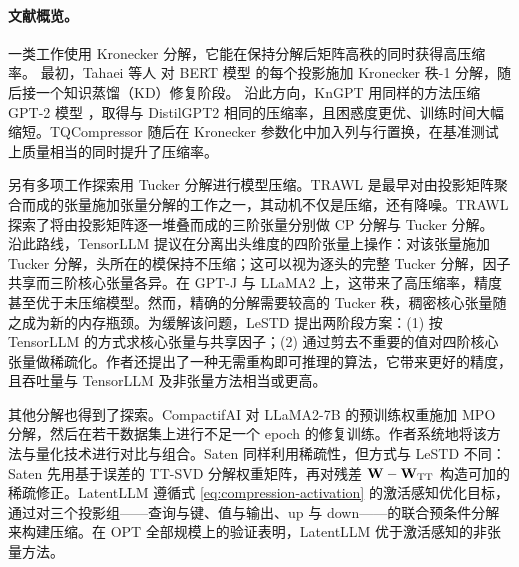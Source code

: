 \documentclass[11pt]{article}
\newcommand{\mat}[1]{\mathbf{#1}}
\begin{document}
\paragraph{文献概览。} 

一类工作使用 Kronecker 分解，它能在保持分解后矩阵高秩的同时获得高压缩率。
最初，Tahaei 等人 \cite{tahaei2021kroneckerbert} 对 BERT 模型 \cite{devlin2019bert} 的每个投影施加 Kronecker 秩-1 分解，随后接一个知识蒸馏（KD）修复阶段。
沿此方向，KnGPT \cite{edalati2021kroneckergpt} 用同样的方法压缩 GPT-2 模型 \cite{radford2019language}，取得与 DistilGPT2 \cite{sanh2019distilbert} 相同的压缩率，且困惑度更优、训练时间大幅缩短。TQCompressor \cite{abronin2024tqcompressor} 随后在 Kronecker 参数化中加入列与行置换，在基准测试上质量相当的同时提升了压缩率。

另有多项工作探索用 Tucker 分解进行模型压缩。TRAWL \cite{luo2025trawl} 是最早对由投影矩阵聚合而成的张量施加张量分解的工作之一，其动机不仅是压缩，还有降噪。TRAWL 探索了将由投影矩阵逐一堆叠而成的三阶张量分别做 CP 分解与 Tucker 分解。
沿此路线，TensorLLM \cite{gu2025tensorllm} 提议在分离出头维度的四阶张量上操作：对该张量施加 Tucker 分解，头所在的模保持不压缩；这可以视为逐头的完整 Tucker 分解，因子共享而三阶核心张量各异。在 GPT-J \cite{wang2021gpt_j} 与 LLaMA2 \cite{touvron2023llama2} 上，这带来了高压缩率，精度甚至优于未压缩模型。然而，精确的分解需要较高的 Tucker 秩，稠密核心张量随之成为新的内存瓶颈。为缓解该问题，LeSTD \cite{li2026lestd} 提出两阶段方案：(1) 按 TensorLLM 的方式求核心张量与共享因子；(2) 通过剪去不重要的值对四阶核心张量做稀疏化。作者还提出了一种无需重构即可推理的算法，它带来更好的精度，且吞吐量与 TensorLLM 及非张量方法相当或更高。

其他分解也得到了探索。CompactifAI \cite{compactifai} 对 LLaMA2-7B \cite{touvron2023llama2} 的预训练权重施加 MPO 分解，然后在若干数据集上进行不足一个 epoch 的修复训练。作者系统地将该方法与量化技术进行对比与组合。Saten \cite{solgi2025saten} 同样利用稀疏性，但方式与 LeSTD \cite{li2026lestd} 不同：Saten 先用基于误差的 TT-SVD \cite{oseledets2011tensor} 分解权重矩阵，再对残差 $\mat{W} - \mat{W}_{\rm TT}$ 构造可加的稀疏修正。LatentLLM \cite{koikeakino2025latentllm} 遵循式 \eqref{eq:compression-activation} 的激活感知优化目标，通过对三个投影组——查询与键、值与输出、up 与 down——的联合预条件分解来构建压缩。在 OPT \cite{zhang2022opt} 全部规模上的验证表明，LatentLLM 优于激活感知的非张量方法。
\end{document}
